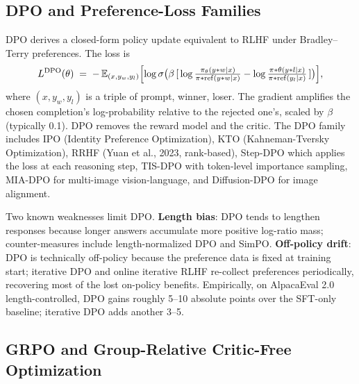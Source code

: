 \documentclass{article}
\begin{document}
\subsection{DPO and Preference-Loss Families}\label{dpo-and-preference-loss-families}

DPO \citep{rafailov20232023} derives a closed-form policy update equivalent to RLHF under Bradley--Terry preferences. The loss is
\[L^{\mathrm{DPO}}(\theta) \;=\; -\,\mathbb{E}_{(x, y_w, y_l)} \Bigl[\log \sigma\bigl(\beta\,[\, \log \tfrac{\pi_\theta(y*w\mid x)}{\pi*{\mathrm{ref}}(y*w\mid x)} - \log \tfrac{\pi*\theta(y*l\mid x)}{\pi*{\mathrm{ref}}(y_l\mid x)} \,]\bigr) \Bigr],\]
where \((x, y_w, y_l)\) is a triple of prompt, winner, loser. The gradient amplifies the chosen completion's log-probability relative to the rejected one's, scaled by \(\beta\) (typically 0.1). DPO removes the reward model and the critic. The DPO family includes IPO (Identity Preference Optimization), KTO (Kahneman-Tversky Optimization), RRHF (Yuan et al., 2023, rank-based), Step-DPO \citep{lai20242024} which applies the loss at each reasoning step, TIS-DPO \citep{liu20242024} with token-level importance sampling, MIA-DPO \citep{liu20242024} for multi-image vision-language, and Diffusion-DPO \citep{wallace20242024} for image alignment.

Two known weaknesses limit DPO. \textbf{Length bias}: DPO tends to lengthen responses because longer answers accumulate more positive log-ratio mass; counter-measures include length-normalized DPO and SimPO. \textbf{Off-policy drift}: DPO is technically off-policy because the preference data is fixed at training start; iterative DPO \citep{xiong20242024} and online iterative RLHF \citep{ye20242024} re-collect preferences periodically, recovering most of the lost on-policy benefits. Empirically, on AlpacaEval 2.0 length-controlled, DPO gains roughly 5--10 absolute points over the SFT-only baseline; iterative DPO adds another 3--5.

\subsection{GRPO and Group-Relative Critic-Free Optimization}\label{grpo-and-group-relative-critic-free-optimization}
\end{document}
